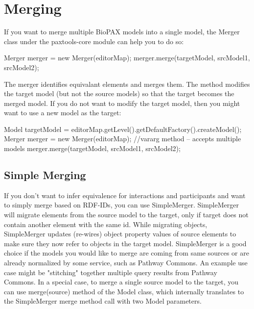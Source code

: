 \documentclass{tufte-book}
\begin{document}
\section{Merging}

If you want to merge multiple BioPAX models into a single model, the Merger class under the paxtools-core module can help you to do so:

\begin{javacode}
  Merger merger = new Merger(editorMap);
   merger.merge(targetModel, srcModel1, srcModel2);
\end{javacode}

The merger identifies equivalant elements and merges them. The method modifies the target model (but not the source models) so that the target becomes the merged model. If you do not want to modify the target model, then you might want to use a new model as the target:

\begin{javacode}
  Model targetModel = 
   editorMap.getLevel().getDefaultFactory().createModel();
  Merger merger = new Merger(editorMap);
//vararg method – accepts multiple models
  merger.merge(targetModel, srcModel1, srcModel2); 
\end{javacode}

\subsection{Simple Merging}
If you don't want to infer equivalence for interactions and participants and want to simply merge based on RDF-IDs, you can use SimpleMerger.  SimpleMerger will migrate elements from the source model to the target, only if target does not contain another element with the same id.  While migrating objects, SimpleMerger updates (re-wires) object property values of source elements to make sure they now refer to objects in the target model. SimpleMerger is a good choice if the models you would like to merge are coming from same sources or are already normalized by some service, such as Pathway Commons. An example use case might be "stitching" together multiple query results from Pathway Commons. 
In a special case, to merge a single source model to the target, you can use merge(source) method of the Model class, which internally translates to the SimpleMerger merge method call with two Model parameters.
\end{document}
